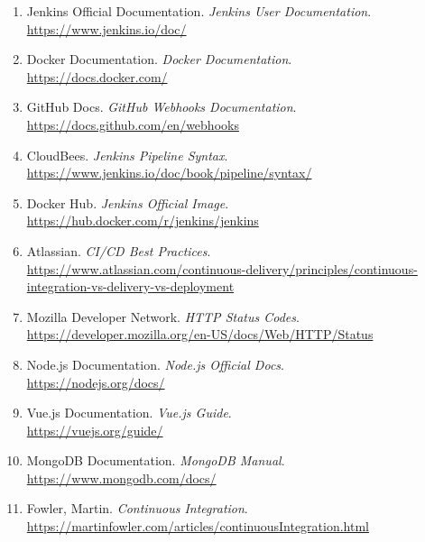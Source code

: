 \documentclass[12pt,a4paper]{article}
\begin{document}
\begin{enumerate}
    \item Jenkins Official Documentation. \textit{Jenkins User Documentation}. \\
    \url{https://www.jenkins.io/doc/}
    
    \item Docker Documentation. \textit{Docker Documentation}. \\
    \url{https://docs.docker.com/}
    
    \item GitHub Docs. \textit{GitHub Webhooks Documentation}. \\
    \url{https://docs.github.com/en/webhooks}
    
    \item CloudBees. \textit{Jenkins Pipeline Syntax}. \\
    \url{https://www.jenkins.io/doc/book/pipeline/syntax/}
    
    \item Docker Hub. \textit{Jenkins Official Image}. \\
    \url{https://hub.docker.com/r/jenkins/jenkins}
    
    \item Atlassian. \textit{CI/CD Best Practices}. \\
    \url{https://www.atlassian.com/continuous-delivery/principles/continuous-integration-vs-delivery-vs-deployment}
    
    \item Mozilla Developer Network. \textit{HTTP Status Codes}. \\
    \url{https://developer.mozilla.org/en-US/docs/Web/HTTP/Status}
    
    \item Node.js Documentation. \textit{Node.js Official Docs}. \\
    \url{https://nodejs.org/docs/}
    
    \item Vue.js Documentation. \textit{Vue.js Guide}. \\
    \url{https://vuejs.org/guide/}
    
    \item MongoDB Documentation. \textit{MongoDB Manual}. \\
    \url{https://www.mongodb.com/docs/}
    
    \item Fowler, Martin. \textit{Continuous Integration}. \\
    \url{https://martinfowler.com/articles/continuousIntegration.html}
    

\end{enumerate}
\end{document}
